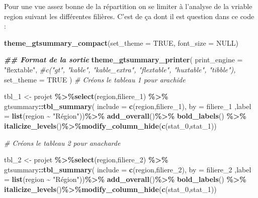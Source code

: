 \documentclass[
]{article}
\newenvironment{Shaded}{\begin{snugshade}}{\end{snugshade}}
\newcommand{\AttributeTok}[1]{\textcolor[rgb]{0.13,0.29,0.53}{#1}}
\newcommand{\CommentTok}[1]{\textcolor[rgb]{0.56,0.35,0.01}{\textit{#1}}}
\newcommand{\ConstantTok}[1]{\textcolor[rgb]{0.56,0.35,0.01}{#1}}
\newcommand{\DocumentationTok}[1]{\textcolor[rgb]{0.56,0.35,0.01}{\textbf{\textit{#1}}}}
\newcommand{\FunctionTok}[1]{\textcolor[rgb]{0.13,0.29,0.53}{\textbf{#1}}}
\newcommand{\NormalTok}[1]{#1}
\newcommand{\OtherTok}[1]{\textcolor[rgb]{0.56,0.35,0.01}{#1}}
\newcommand{\SpecialCharTok}[1]{\textcolor[rgb]{0.81,0.36,0.00}{\textbf{#1}}}
\newcommand{\StringTok}[1]{\textcolor[rgb]{0.31,0.60,0.02}{#1}}
\begin{document}
Pour une vue assez bonne de la répartition on se limiter à l'analyse de
la vriable region suivant les différentes filières. C'est de ça dont il
est question dans ce code :

\begin{Shaded}
\begin{Highlighting}[]
\FunctionTok{theme\_gtsummary\_compact}\NormalTok{(}\AttributeTok{set\_theme =} \ConstantTok{TRUE}\NormalTok{, }\AttributeTok{font\_size =} \ConstantTok{NULL}\NormalTok{)}

\DocumentationTok{\#\# Format de la sortie}
\FunctionTok{theme\_gtsummary\_printer}\NormalTok{(}
  \AttributeTok{print\_engine =} \StringTok{"flextable"}\NormalTok{,  }
  \CommentTok{\#c("gt", "kable", "kable\_extra", "flextable", "huxtable", "tibble"),}
  \AttributeTok{set\_theme =} \ConstantTok{TRUE}
\NormalTok{)}
               \CommentTok{\# Créons le tableau 1 pour arachide}

\NormalTok{tbl\_1 }\OtherTok{\textless{}{-}}\NormalTok{ projet }\SpecialCharTok{\%\textgreater{}\%}\FunctionTok{select}\NormalTok{(region,filiere\_1) }\SpecialCharTok{\%\textgreater{}\%}
\NormalTok{  gtsummary}\SpecialCharTok{::}\FunctionTok{tbl\_summary}\NormalTok{(}
    \AttributeTok{include =} \FunctionTok{c}\NormalTok{(region,filiere\_1),}
    \AttributeTok{by =}\NormalTok{ filiere\_1}
\NormalTok{  ,}\AttributeTok{label =} \FunctionTok{list}\NormalTok{(region }\SpecialCharTok{\textasciitilde{}} \StringTok{"Région"}\NormalTok{))}\SpecialCharTok{\%\textgreater{}\%}
  \FunctionTok{add\_overall}\NormalTok{()}\SpecialCharTok{\%\textgreater{}\%}
  \FunctionTok{bold\_labels}\NormalTok{() }\SpecialCharTok{\%\textgreater{}\%}
  \FunctionTok{italicize\_levels}\NormalTok{()}\SpecialCharTok{\%\textgreater{}\%}\FunctionTok{modify\_column\_hide}\NormalTok{(}\FunctionTok{c}\NormalTok{(stat\_0,stat\_1))}

               \CommentTok{\# Créons le tableau 2 pour anacharde}

\NormalTok{tbl\_2 }\OtherTok{\textless{}{-}}\NormalTok{ projet }\SpecialCharTok{\%\textgreater{}\%}\FunctionTok{select}\NormalTok{(region,filiere\_2) }\SpecialCharTok{\%\textgreater{}\%}
\NormalTok{  gtsummary}\SpecialCharTok{::}\FunctionTok{tbl\_summary}\NormalTok{(}
    \AttributeTok{include =} \FunctionTok{c}\NormalTok{(region,filiere\_2),}
    \AttributeTok{by =}\NormalTok{ filiere\_2}
\NormalTok{  ,}\AttributeTok{label =} \FunctionTok{list}\NormalTok{(region }\SpecialCharTok{\textasciitilde{}} \StringTok{"Région"}\NormalTok{))}\SpecialCharTok{\%\textgreater{}\%}
  \FunctionTok{add\_overall}\NormalTok{()}\SpecialCharTok{\%\textgreater{}\%}
  \FunctionTok{bold\_labels}\NormalTok{() }\SpecialCharTok{\%\textgreater{}\%}
  \FunctionTok{italicize\_levels}\NormalTok{()}\SpecialCharTok{\%\textgreater{}\%}\FunctionTok{modify\_column\_hide}\NormalTok{(}\FunctionTok{c}\NormalTok{(stat\_0,stat\_1))}


\end{Highlighting}
\end{Shaded}
\end{document}
